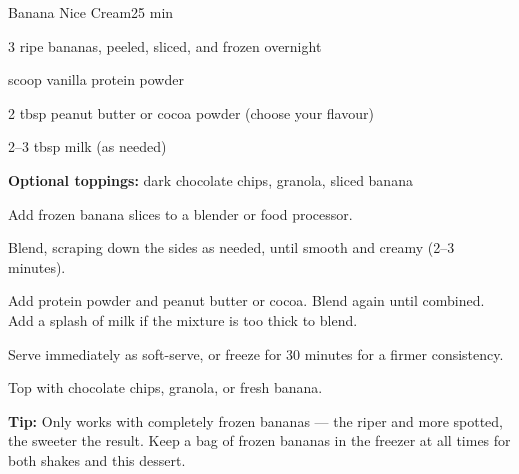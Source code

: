 \begin{recipebox}{Banana Nice Cream}{2}{5 min}
\begin{ingredients}
  \item 3 ripe bananas, peeled, sliced, and frozen overnight
  \item \textonehalf{} scoop vanilla protein powder
  \item 2 tbsp peanut butter or cocoa powder (choose your flavour)
  \item 2--3 tbsp milk (as needed)
  \item \textbf{Optional toppings:} dark chocolate chips, granola, sliced banana
\end{ingredients}

\begin{method}
  \item Add frozen banana slices to a blender or food processor.
  \item Blend, scraping down the sides as needed, until smooth and creamy (2--3 minutes).
  \item Add protein powder and peanut butter or cocoa. Blend again until combined. Add a splash of milk if the mixture is too thick to blend.
  \item Serve immediately as soft-serve, or freeze for 30 minutes for a firmer consistency.
  \item Top with chocolate chips, granola, or fresh banana.
\end{method}


\begin{notelist}
  \item \textbf{Tip:} Only works with completely frozen bananas --- the riper and more spotted, the sweeter the result. Keep a bag of frozen bananas in the freezer at all times for both shakes and this dessert.
\end{notelist}
\end{recipebox}
